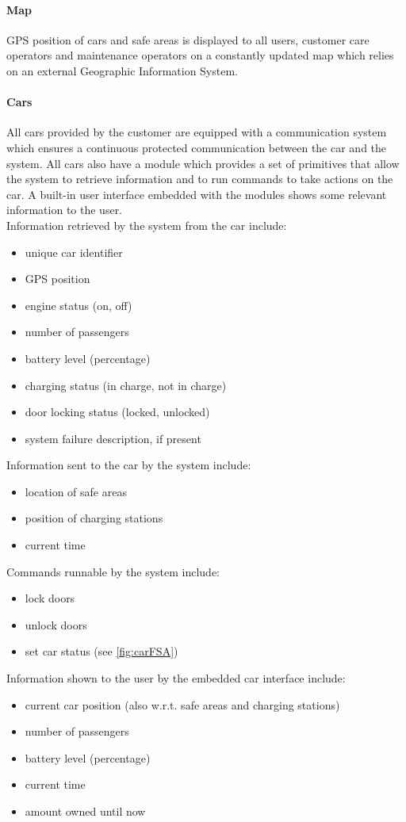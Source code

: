 	\paragraph{Map} GPS position of cars and safe areas is displayed to all users, customer care operators and maintenance operators on a constantly updated map which relies on an external Geographic Information System.

	\paragraph{Cars}\label{sec:cars}All cars provided by the customer are equipped with a communication system which ensures a continuous protected communication between the car and the system. All cars also have a module which provides a set of primitives that allow the system to retrieve information and to run commands to take actions on the car. A built-in user interface embedded with the modules shows some relevant information to the user.\\
	Information retrieved by the system from the car include:
	\begin{itemize}
		\item unique car identifier
		\item GPS position
		\item engine status (on, off)
		\item number of passengers
		\item battery level (percentage)
		\item charging status (in charge, not in charge)
		\item door locking status (locked, unlocked)
		\item system failure description, if present
	\end{itemize}
	Information sent to the car by the system include:
	\begin{itemize}
		\item location of safe areas
		\item position of charging stations
		\item current time
	\end{itemize}
	Commands runnable by the system include:
	\begin{itemize}
		\item lock doors 
		\item unlock doors
		\item set car status (see \autoref{fig:carFSA})
	
	\end{itemize}		
	Information shown to the user by the embedded car interface include:
	\begin{itemize}
		\item current car position (also w.r.t. safe areas and charging stations)
		\item number of passengers
		\item battery level (percentage)
		\item current time
		\item amount owned until now
	\end{itemize}

